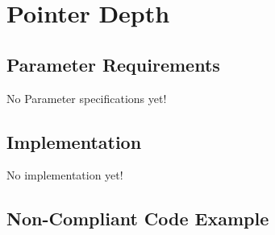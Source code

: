 %
%

\section{Pointer Depth}
\label{PointerDepth::overview}


\subsection{Parameter Requirements}

   No Parameter specifications yet!

\subsection{Implementation}

   No implementation yet!

\subsection{Non-Compliant Code Example}


